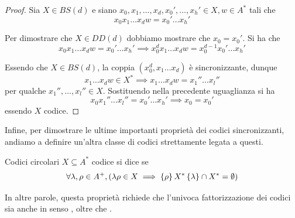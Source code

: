 \begin{proof}
  Sia \(X\in BS(d)\) e siano \(x_0,x_1,\ldots,x_d,x_0',\ldots,x_h' \in X, w \in A^*\) tali che
  \[x_0x_1\ldots x_d w = x_0'\ldots x_h'\]

  Per dimostrare che \(X \in DD(d)\) dobbiamo mostrare che \(x_0 = x_0'\).
  Si ha che
  \[x_0x_1\ldots x_d w = x_0'\ldots x_h' \implies x_0^d x_1\ldots x_d w = x_0^{d-1}x_0'\ldots x_h'\]

  Essendo che \(X \in BS(d)\), la coppia \((x_0^d, x_1\ldots x_d)\) è sincronizzante, dunque
  \[x_1\ldots x_d w \in X^* \implies x_1\ldots x_d w = x_1''\ldots x_l''\]
  per qualche \(x_1'',\ldots, x_l'' \in X\).
  Sostituendo nella precedente uguaglianza si ha
  \[x_0x_1''\ldots x_l'' = x_0'\ldots x_h' \implies x_0 = x_0'\]
  essendo \(X\) codice.
\end{proof}

Infine, per dimostrare le ultime importanti proprietà dei codici sincronizzanti, andiamo a definire un'altra classe di codici strettamente legata a questi.

\begin{definition}{Codici circolari}
  \(X \subseteq A^*\) codice si dice  se
  \[\forall \lambda, \rho \in A^+, (\lambda \rho \in X\implies \set{\rho}X^*\set{\lambda} \cap X^* = \emptyset)\]
\end{definition}

In altre parole, questa proprietà richiede che l'univoca fattorizzazione dei codici sia anche in senso , oltre che .

